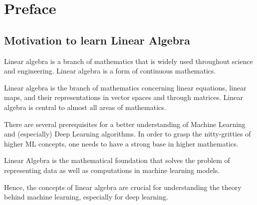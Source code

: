\chapter*{Preface}

\section*{Motivation to learn Linear Algebra}

\para

Linear algebra is a branch of mathematics that is widely used throughout science and engineering. Linear algebra is a form of continuous mathematics. 

\para

Linear algebra is the branch of mathematics concerning linear equations, linear maps, and their representations in vector spaces and through matrices. Linear algebra is central to almost all areas of mathematics.

\para

There are several prerequisites for a better understanding of Machine Learning and (especially) Deep Learning algorithms. In order to grasp the nitty-gritties of higher ML concepts, one needs to have a strong base in higher mathematics.

\para

Linear Algebra is the mathematical foundation that solves the problem of representing data as well as computations in machine learning models.

\para

Hence, the concepts of linear algebra are crucial for understanding the theory behind machine learning, especially for deep learning.
